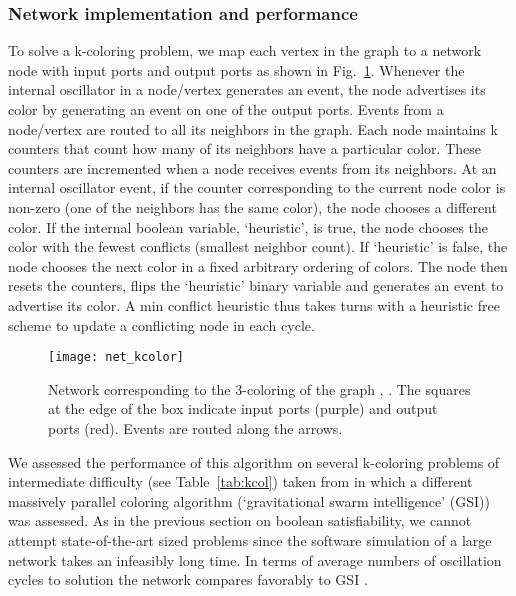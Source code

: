 \documentclass[10pt]{article}
\begin{document}
\subsubsection*{Network implementation and performance}
\label{sec:kalg}
To solve a k-coloring problem, we map each vertex in the graph to a network node with  input ports and  output ports as shown in Fig.~\ref{fig:net_kcolor}. Whenever the internal oscillator in a node/vertex generates an event, the node advertises its color by generating an event on one of the  output ports. Events from a node/vertex are routed to all its neighbors in the graph. Each node maintains k counters that count how many of its neighbors have a particular color. These counters are incremented when a node receives events from its neighbors. At an internal oscillator event, if the counter corresponding to the current node color is non-zero (one of the neighbors has the same color), the node chooses a different color. If the internal boolean variable, `heuristic', is true, the node chooses the color with the fewest conflicts (smallest neighbor count). If `heuristic' is false, the node chooses the next color in a fixed arbitrary ordering of colors. The node then resets the  counters, flips the `heuristic' binary variable and generates an event to advertise its color. A min conflict heuristic thus takes turns with a heuristic free scheme to update a conflicting node in each cycle.




\begin{figure}
  \centering
     \texttt{[image: net\_kcolor]} 
     \caption{Network corresponding to the 3-coloring of the graph , . The squares at the edge of the box indicate input ports (purple) and output ports (red). Events are routed along the arrows.}
\label{fig:net_kcolor}
\end{figure}	


We assessed the performance of this algorithm on several k-coloring problems of intermediate difficulty (see Table~\ref{tab:kcol}) taken from \cite{Ruiz_Romay11} in which a different massively parallel coloring algorithm (`gravitational swarm intelligence' (GSI)) was assessed. As in the previous section on boolean satisfiability, we cannot attempt state-of-the-art sized problems since the software simulation of a large network takes an infeasibly long time. In terms of average numbers of oscillation cycles to solution the network compares favorably to GSI \cite{Ruiz_Romay11}.
\end{document}
